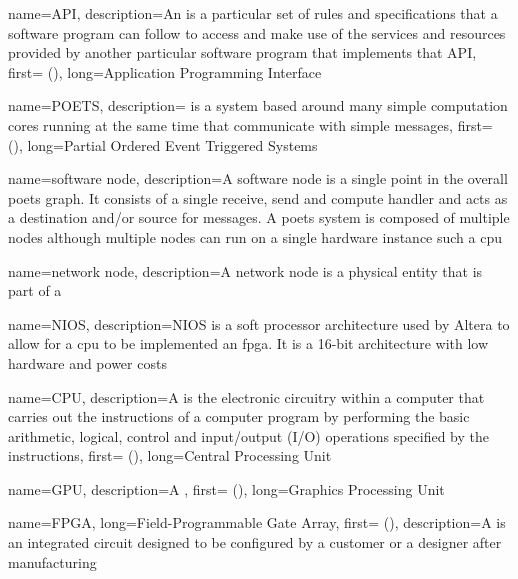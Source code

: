 
{
    name={API},
    description={An  is a particular set
            of rules and specifications that a software program can follow to access and make use of the services and resources provided by another particular software program that implements that API},
    first={} (),
    long={Application Programming Interface}
}

{
	name={POETS},
    description={ is a system based around many simple computation cores running at the same time that communicate with simple messages},
    first={} (),
    long={Partial Ordered Event Triggered Systems}
}

{
	name={software node},
    description={A software node is a single point in the overall \gls{poets} graph. It consists of a single receive, send and compute handler and acts as a destination and/or source for messages. A \gls{poets} system is composed of multiple nodes although multiple nodes can run on a single hardware instance such a \gls{cpu}}
}

{
	name={network node},
    description={A network node is a physical entity that is part of a }
}

{
	name={NIOS},
    description={NIOS is a \gls{soft processor} architecture used by Altera to allow for a \gls{cpu} to be implemented an \gls{fpga}. It is a 16-bit architecture with low hardware and power costs}
}

{
	name={CPU},
    description={A  is the electronic circuitry within a computer that carries out the instructions of a computer program by performing the basic arithmetic, logical, control and input/output (I/O) operations specified by the instructions},
    first={} (),
    long={Central Processing Unit}
}

{
	name={GPU},
    description={A  },
    first={} (),
    long={Graphics Processing Unit}
}

{
	name={FPGA},
    long={Field-Programmable Gate Array},
    first={} (),
    description={A  is an integrated circuit designed to be configured by a customer or a designer after manufacturing}
}

